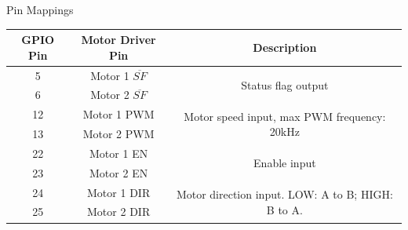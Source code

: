 \documentclass[12pt,letterpaper]{beamer}
\begin{document}
\begin{frame}{Pin Mappings}
    \begin{tabular}{ ccc }
        \hline
        GPIO Pin & Motor Driver Pin & Description \\
        \hline
        5  & Motor 1 $\overline{SF}$  & \multirow{2}{12em}{\scriptsize Status flag output}  \\
        6  & Motor 2 $\overline{SF}$  &  \\
        \hline
        12  & Motor 1 PWM  & \multirow{2}{12em}{\scriptsize Motor speed input, max PWM frequency: 20kHz}  \\
        13  & Motor 2 PWM  &  \\
        \hline
        22  & Motor 1 EN  & \multirow{2}{12em}{\scriptsize Enable input}  \\
        23  & Motor 2 EN  &  \\
        \hline
        24  & Motor 1 DIR  & \multirow{2}{12em}{\scriptsize Motor direction input. LOW: A to B; HIGH: B to A.}  \\
        25  & Motor 2 DIR  &  \\
        \hline
    \end{tabular}
\end{frame}
\end{document}
